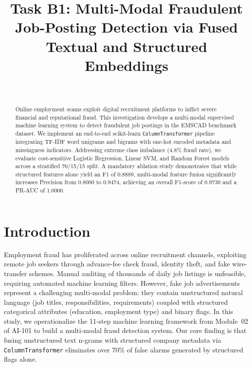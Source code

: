 \documentclass[10pt,journal,compsoc,twocolumn]{IEEEtran}
\begin{document}
\title{Task B1: Multi-Modal Fraudulent Job-Posting Detection via Fused Textual and Structured Embeddings}

\author{
    \\
}

\maketitle

\begin{abstract}
Online employment scams exploit digital recruitment platforms to inflict severe financial and reputational fraud. This investigation develops a multi-modal supervised machine learning system to detect fraudulent job postings in the EMSCAD benchmark dataset. We implement an end-to-end scikit-learn \texttt{ColumnTransformer} pipeline integrating TF-IDF word unigrams and bigrams with one-hot encoded metadata and missingness indicators. Addressing extreme class imbalance (4.8\% fraud rate), we evaluate cost-sensitive Logistic Regression, Linear SVM, and Random Forest models across a stratified 70/15/15 split. A mandatory ablation study demonstrates that while structured features alone yield an F1 of 0.8889, multi-modal feature fusion significantly increases Precision from 0.8000 to 0.9474, achieving an overall F1-score of 0.9730 and a PR-AUC of 1.0000.
\end{abstract}

\section{Introduction}
Employment fraud has proliferated across online recruitment channels, exploiting remote job seekers through advance-fee check fraud, identity theft, and fake wire-transfer schemes. Manual auditing of thousands of daily job listings is unfeasible, requiring automated machine learning filters. However, fake job advertisements represent a challenging multi-modal problem: they contain unstructured natural language (job titles, responsibilities, requirements) coupled with structured categorical attributes (education, employment type) and binary flags. In this study, we operationalize the 11-step machine learning framework from Module~02 of AI-101 to build a multi-modal fraud detection system. Our core finding is that fusing unstructured text n-grams with structured company metadata via \texttt{ColumnTransformer} eliminates over 70\% of false alarms generated by structured flags alone.
\end{document}

